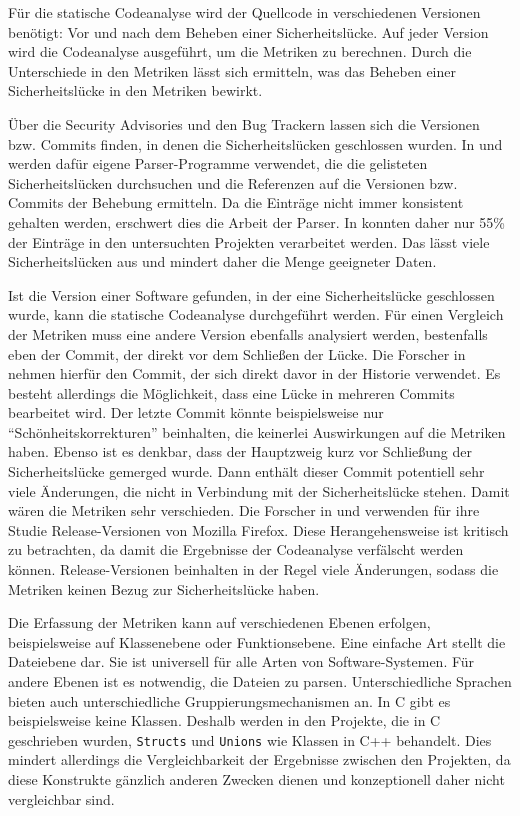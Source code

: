 Für die statische Codeanalyse wird der Quellcode in verschiedenen Versionen benötigt: Vor und nach dem Beheben einer Sicherheitslücke.
Auf jeder Version wird die Codeanalyse ausgeführt, um die Metriken zu berechnen.
Durch die Unterschiede in den Metriken lässt sich ermitteln, was das Beheben einer Sicherheitslücke in den Metriken bewirkt.

Über die Security Advisories und den Bug Trackern lassen sich die Versionen bzw. Commits finden, in denen die Sicherheitslücken geschlossen wurden.
In \cite{alves_et_al} und \cite{chowdhury_zulkernine_2009} werden dafür eigene Parser-Programme verwendet, die die gelisteten Sicherheitslücken durchsuchen und die Referenzen auf die Versionen bzw. Commits der Behebung ermitteln.
Da die Einträge nicht immer konsistent gehalten werden, erschwert dies die Arbeit der Parser.
In \cite{alves_et_al} konnten daher nur 55\% der Einträge in den untersuchten Projekten verarbeitet werden.
Das lässt viele Sicherheitslücken aus und mindert daher die Menge geeigneter Daten.

Ist die Version einer Software gefunden, in der eine Sicherheitslücke geschlossen wurde, kann die statische Codeanalyse durchgeführt werden.
Für einen Vergleich der Metriken muss eine andere Version ebenfalls analysiert werden, bestenfalls eben der Commit, der direkt vor dem Schließen der Lücke.
Die Forscher in \cite{alves_et_al} nehmen hierfür den Commit, der sich direkt davor in der Historie verwendet.
Es besteht allerdings die Möglichkeit, dass eine Lücke in mehreren Commits bearbeitet wird.
Der letzte Commit könnte beispielsweise nur "`Schönheitskorrekturen"' beinhalten, die keinerlei Auswirkungen auf die Metriken haben.
Ebenso ist es denkbar, dass der Hauptzweig kurz vor Schließung der Sicherheitslücke gemerged wurde.
Dann enthält dieser Commit potentiell sehr viele Änderungen, die nicht in Verbindung mit der Sicherheitslücke stehen.
Damit wären die Metriken sehr verschieden.
Die Forscher in \cite{chowdhury_zulkernine_2009} und \cite{chowdhury_zulkernine_2010} verwenden für ihre Studie Release-Versionen von Mozilla Firefox.
Diese Herangehensweise ist kritisch zu betrachten, da damit die Ergebnisse der Codeanalyse verfälscht werden können.
Release-Versionen beinhalten in der Regel viele Änderungen, sodass die Metriken keinen Bezug zur Sicherheitslücke haben.

Die Erfassung der Metriken kann auf verschiedenen Ebenen erfolgen, beispielsweise auf Klassenebene oder Funktionsebene.
Eine einfache Art stellt die Dateiebene dar.
Sie ist universell für alle Arten von Software-Systemen.
Für andere Ebenen ist es notwendig, die Dateien zu parsen.
Unterschiedliche Sprachen bieten auch unterschiedliche Gruppierungsmechanismen an.
In C gibt es beispielsweise keine Klassen.
Deshalb werden in \cite{alves_et_al} den Projekte, die in C geschrieben wurden, \texttt{Structs} und \texttt{Unions} wie Klassen in C++ behandelt.
Dies mindert allerdings die Vergleichbarkeit der Ergebnisse zwischen den Projekten, da diese Konstrukte gänzlich anderen Zwecken dienen und konzeptionell daher nicht vergleichbar sind.

